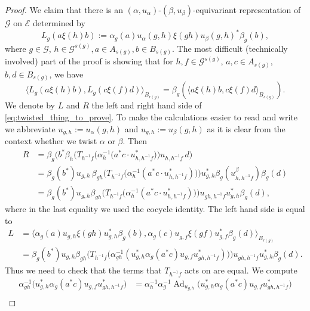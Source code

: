\documentclass[10pt,a4paper]{amsart}
\DeclareMathOperator{\Ad}{Ad}
\newcommand{\EE}{\mathcal E}
\newcommand{\G}{\mathcal G} %
\begin{document}
\begin{proof}
We claim that there is an $(\alpha,u_{\alpha})$-$(\beta,u_{\beta})$-equivariant representation of $\G$ on $\EE$ determined by
\begin{equation}\label{eq:Ldef} 
    L_g (a \xi(h)b) := \alpha_g(a)u_{\alpha}{(g,h)} \xi(gh)u_{\beta}(g,h)^*\beta_g(b),
\end{equation}
where $g\in \G$, $h \in \G^{s(g)}, a \in A_{s(g)}, b \in B_{s(g)}$. 
The most difficult (technically involved) part of the proof is showing that for $h, f \in \G^{s(g)}$, $a, c \in A_{s(g)}$, $b, d \in B_{s(g)}$, we have 
\begin{equation}\label{eq:twisted_thing_to_prove} 
    \langle L_g (a \xi(h)b) , L_g (c \xi(f)d) \rangle_{B_{r(g)}} = \beta_g(\langle a \xi(h)b , c \xi(f)d\rangle_{B_{s(g)}}).
\end{equation}
We denote by $L$ and $R$ the left and right hand side of \eqref{eq:twisted_thing_to_prove}. 
To make the calculations easier to read and write we abbreviate $u_{g,h} := u_{\alpha}{(g,h)}$ and $u_{g,h}:=u_{\beta}{(g,h)}$ as it is clear from the context whether we twist $\alpha$ or $\beta$. 
Then 
\[
\begin{split}
    R &= \beta_g \Big( b^*\beta_{h} \Big(T_{h^{-1} f} \big( \alpha_h^{-1}( a^* c\cdot  u^{*}_{h,h^{-1}f} \big) \Big) u_{h,h^{-1}f}\, d\Big) \\
    &= \beta_g(b^*)u_{g,h}\,\beta_{gh} \Big( T_{h^{-1} f} \big( \alpha_h^{-1}( a^* c\cdot  u^{*}_{h,h^{-1}f}) \big) \Big) u^{*}_{g,h} \beta_g(u^{\beta}_{h,h^{-1}f}) \beta_g(d) \\
    &= \beta_g(b^*)u_{g,h} \beta_{gh} \Big( T_{h^{-1} f} \big( \alpha_h^{-1}( a^* c\cdot  u^{*}_{h,h^{-1}f}) \big) \Big) u_{gh,h^{-1}f} u^{*}_{g,h} \beta_g(d) ,
\end{split}
\]
where in the last equality we used the cocycle identity. 
The left hand side is equal to 
\[
\begin{split} 
    L &= \Big \langle \alpha_g(a)u_{g,h} \xi(gh)u^{*}_{g,h}\beta_g(b) , \alpha_g(c)u^{}_{g,f} \xi(gf)u^{*}_{g,f}\beta_g(d)  \Big\rangle_{B_{r(g)}} \\
        &= \beta_g(b^*)u_{g,h}\beta_{gh} \Big(T_{h^{-1} f} \big(\alpha_{gh}^{-1}(u^{*}_{g,h}  \alpha_g(a^* c)u_{g,f} u^{*}_{gh,h^{-1}f}) \big)\Big) u_{gh,h^{-1}f}u^{*}_{g,h} \beta_g(d).
\end{split}
\]
Thus we need to check that the terms that $T_{h^{-1} f}$ acts on are equal. 
We compute 
\[
\begin{split} 
    \alpha_{gh}^{-1} \big(u^{*}_{g,h} \alpha_g(a^* c)u_{g,f} u^{*}_{gh,h^{-1}f}\big) &= \alpha_{h}^{-1} \alpha_{g}^{-1} \Ad_{u_{g,h}} \big( u^{*}_{g,h}  \alpha_g(a^* c)u_{g,f} u^{*}_{gh,h^{-1}f} \big) \\

\end{split}\]
\end{proof}
\end{document}
